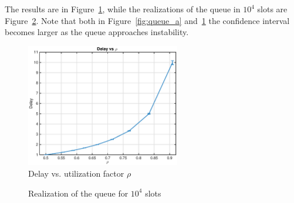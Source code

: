 \documentclass[10pt]{article}
\begin{document}
The results are in Figure~\ref{fig:queue_b}, while the realizations of the queue in $10^4$ slots are Figure~\ref{fig:queue_b_real}. Note that both in Figure~\ref{fig:queue_a} and~\ref{fig:queue_b} the confidence interval becomes larger as the queue approaches instability.

\begin{figure}[h!]
\centering

  \includegraphics[width = 0.6\textwidth]{queue_b_dl}
  \caption{Delay vs. utilization factor $\rho$}
  \label{fig:queue_b}
\end{figure}

\begin{figure}[h!]
\centering
  \caption{Realization of the queue for $10^4$ slots}
  \label{fig:queue_b_real}
\end{figure}
\end{document}

